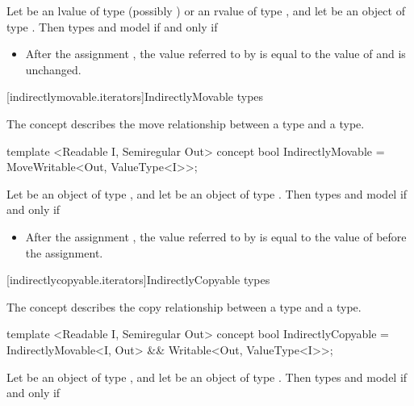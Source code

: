 \begin{addedblock}
\pnum
Let  be an lvalue of type (possibly )  or an rvalue
of type , and let  be an object of type . Then types
 and  model  if and only if

\begin{itemize}
\item After the assignment , the value referred to by  is equal to
the value of  and  is unchanged.
\end{itemize}

[indirectlymovable.iterators]{IndirectlyMovable types}

\pnum
The  concept describes the move relationship between a 
type and a  type.

%
\begin{codeblock}
  template <Readable I, Semiregular Out>
  concept bool IndirectlyMovable =
    MoveWritable<Out, ValueType<I>>;
\end{codeblock}

\pnum
Let  be an object of type , and let  be an object of type .
Then types  and  model  if and only if

\begin{itemize}
\item After the assignment , the value referred to by  is equal to
the value of  before the assignment.
\end{itemize}

[indirectlycopyable.iterators]{IndirectlyCopyable types}

\pnum
The  concept describes the copy relationship between a 
type and a  type.

%
\begin{codeblock}
  template <Readable I, Semiregular Out>
  concept bool IndirectlyCopyable =
    IndirectlyMovable<I, Out> &&
    Writable<Out, ValueType<I>>;
\end{codeblock}

\pnum
Let  be an object of type , and let  be an object of type .
Then types  and  model  if and only if


\end{addedblock}
